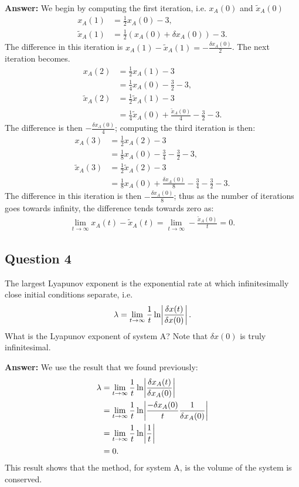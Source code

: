 \documentclass[a4paper]{article}
\newcommand{\newparagraph}{\vspace{.5cm}\noindent}
\begin{document}
\newparagraph
\textbf{Answer: }We begin by computing the first iteration, i.e. $x_A(0)$ and $\tilde{x}_A(0)$
\begin{align*}
    x_A(1) &= \frac{1}{2}x_A(0) - 3,\\
    \tilde{x}_A(1) &= \frac{1}{2}\left(x_A(0) + \delta x_A(0)\right) - 3.
\end{align*}The difference in this iteration is $x_A(1) - \tilde{x}_A(1) = -\frac{\delta x_A(0)}{2}$. The next iteration becomes.
\begin{align*}
    x_A(2) &= \frac{1}{2}x_A(1) - 3\\
    &= \frac{1}{4}x_A(0) - \frac{3}{2}  - 3,\\
    \tilde{x}_A(2) &= \frac{1}{2}\tilde{x}_A(1) - 3\\
    &= \frac{1}{4}\tilde{x}_A(0) + \frac{\tilde{x}_A(0)}{4} - \frac{3}{2} - 3.
\end{align*}The difference is then $-\frac{\delta x_A(0)}{4}$; computing the third iteration is then:
\begin{align*}
    x_A(3) &= \frac{1}{2}x_A(2) - 3\\
    &= \frac{1}{8}x_A(0) - \frac{3}{4} - \frac{3}{2} - 3,\\
    \tilde{x}_A(3) &= \frac{1}{2}\tilde{x}_A(2) - 3\\
    &= \frac{1}{8}x_A(0) + \frac{\delta x_A(0)}{8}-\frac{3}{4} - \frac{3}{2} - 3.
\end{align*}The difference in this iteration is then $-\frac{\delta x_A(0)}{8}$; thus as the number of iterations goes towards infinity, the difference tends towards zero as:
\begin{align*}
    \lim_{t\to\infty} x_A(t) - \tilde{x}_A(t) = \lim_{t\to\infty}-\frac{\tilde x_A(0)}{t} = 0.
\end{align*}

\subsection*{Question 4}
The largest Lyapunov exponent is the exponential rate at which infinitesimally close initial conditions separate, i.e.
\begin{align*}
    \lambda = \lim_{t\to\infty}\frac{1}{t}\ln\abs{\frac{\delta x(t)}{\delta x(0)}}.
\end{align*}What is the Lyapunov exponent of system A? Note that $\delta x(0)$ is truly infinitesimal.

\newparagraph
\textbf{Answer: }We use the result that we found previously:
\begin{align*}
    \lambda &= \lim_{t\to\infty}\frac{1}{t}\ln\abs{\frac{\delta x_A(t)}{\delta x_A(0)}}\\
    &= \lim_{t\to\infty}\frac{1}{t}\ln\abs{\frac{-\delta x_A(0)}{t}\frac{1}{\delta x_A(0)}}\\
    &= \lim_{t\to\infty}\frac{1}{t}\ln\abs{\frac{1}{t}}\\
    &= 0.
\end{align*}This result shows that the method, for system {\color{blue} A}, is the volume of the system is conserved.
\end{document}
